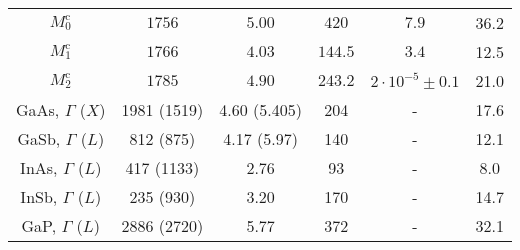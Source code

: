 \begin{table}
\begin{tabularx}{1\textwidth}{cccccc}
		
		$M_0^\mathrm{c}$& $1756$ & $5.00$& $420$& $7.9$&36.2\\
		$M_1^\mathrm{c}$& $1766$ & $4.03$& $144.5$& $3.4$&12.5\\
		$M_2^\mathrm{c}$ & $1785$ & $4.90$& $243.2$& $2\cdot 10^{-5}\pm0.1$&21.0\\%
		\midrule
		GaAs, $\Gamma$ ($X$)& 1981 (1519)& 4.60 (5.405)& 204& -&17.6\\
		GaSb, $\Gamma$ ($L$)& 812 (875)& 4.17 (5.97)& 140& -&12.1\\
		InAs, $\Gamma$ ($L$)& 417 (1133)& 2.76& 93& -&8.0\\
		InSb, $\Gamma$ ($L$)& 235 (930)& 3.20& 170& -&14.7\\
		GaP, $\Gamma$ ($L$)& 2886 (2720)& 5.77& 372& -&32.1\\
		\bottomrule
	\end{tabularx}\label{tab:Varshni}
\end{table}

